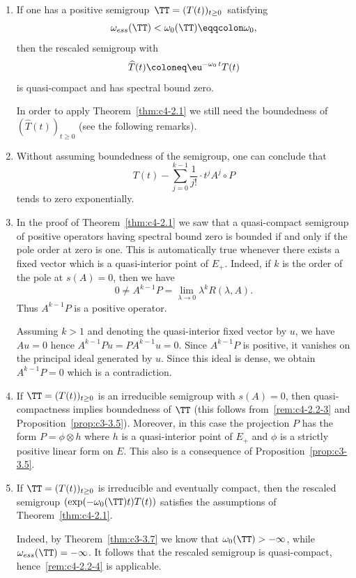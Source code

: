 \begin{remarks}\label{rem:c4-2.2}
\begin{enumerate}[\upshape (i), wide, labelindent=.25em]

\item \label{rem:c4-2.2-1}
If one has a positive semigroup\, $\TT = (T(t))_{t \geq 0}$\,  satisfying
\[
\omega_{ess}(\TT) <  \omega_0(\TT) \eqqcolon \omega_0, 
\]
then the rescaled semigroup with 
\[
\widehat{T}(t) \coloneq \eu^{-\omega_0 \, t }T(t)
\]
is quasi-compact and has spectral bound zero.

In order to apply Theorem~\ref{thm:c4-2.1} we still need the boundedness of\/ $(\widehat{T}(t))_{t\geq 0}$ (see the following remarks).

\item \label{rem:c4-2.2-2}
Without assuming boundedness of the semigroup, one can conclude that
\[
T(t) - \sum_{j=0}^{k-1} \frac{1}{j!} \cdot t^{j}A^{j}{\circ}P
\]
tends to zero exponentially.

\item \label{rem:c4-2.2-3}
In the proof of Theorem~\ref{thm:c4-2.1} we saw that a quasi-compact semigroup of positive operators having spectral bound zero is bounded if and only if the pole order at zero is one.
This is automatically true whenever there exists a fixed vector which is a quasi-interior point of\/ $E_{+}$.
Indeed, if\/ $k$ is the order of the pole at $s(A) = 0$, then we have 
\[
0 \neq A^{k-1}P = \lim_{\lambda \to 0} \lambda^{k}R(\lambda,A).
\]
Thus $A^{k-1}P$ is a positive operator.

Assuming $k > 1$ and denoting the quasi-interior fixed vector by $u$, we have $Au = 0$ hence $A^{k-1}Pu = PA^{k-1}u = 0$.
Since $A^{k-1}P$ is positive, it vanishes on the principal ideal generated by $u$.
Since this ideal is dense, we obtain $A^{k-1}P = 0$ which is a contradiction.

\item  \label{rem:c4-2.2-4}
If\/ $\TT = (T(t))_{t \geq 0}$ is an irreducible semigroup with $s(A) = 0$, then quasi-compactness implies boundedness of\/ $\TT$ (this follows from~\ref{rem:c4-2.2-3} and Proposition~\ref{prop:c3-3.5}).
Moreover, in this case the projection $P$ has the form $P = \phi \otimes h$ where $h$ 
is a quasi-interior point of\/ $E_{+}$ and $\phi$ is a strictly positive linear form on $E$.
This also is a consequence of Proposition~\ref{prop:c3-3.5}.

\item  \label{rem:c4-2.2-5}
If\/ $\TT = (T(t))_{t \geq 0}$ is irreducible and eventually compact, then the rescaled semigroup $(\exp(-\omega_0(\TT)t)T(t))$ satisfies the assumptions of Theorem~\ref{thm:c4-2.1}.

Indeed, by Theorem~\ref{thm:c3-3.7} we know that $\omega_0(\TT) > -\infty$, while $\omega_{ess}(\TT) = -\infty$.
It follows that the rescaled semigroup is quasi-compact, hence~\ref{rem:c4-2.2-4} is applicable.
\end{enumerate}
\end{remarks}
